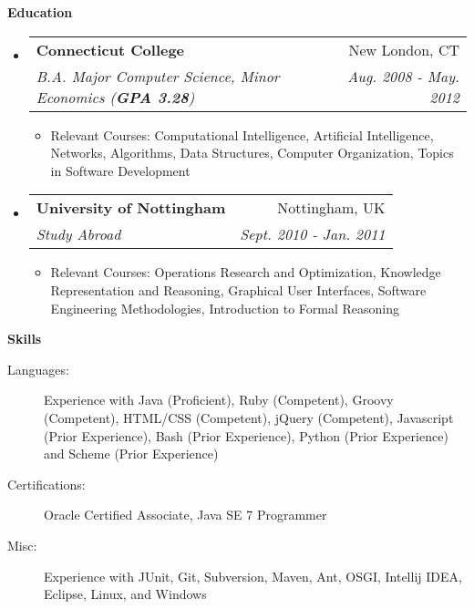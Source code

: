 \documentclass[letterpaper,11pt]{article}
\makeatletter
\newcommand{\resitem}[1]{\item #1 \vspace{-2pt}}
\newcommand{\resheading}[1]{{\large \colorbox{mygrey}{\begin{minipage}{\textwidth}{\textbf{#1 \vphantom{p\^{E}}}}\end{minipage}}}}
\newcommand{\ressubheading}[4]{
\begin{tabular*}{7.0in}{l@{\extracolsep{\fill}}r}
		\textbf{#1} & #2 \\
		\textit{#3} & \textit{#4} \\
\end{tabular*}\vspace{-6pt}}
\makeatother
\begin{document}
\resheading{Education}
\begin{itemize}
	\item
	\ressubheading{Connecticut College}{New London, CT}{B.A. Major Computer Science, Minor Economics (\textbf{GPA 3.28})}{Aug. 2008 - May. 2012}
	\begin{itemize}
		\resitem{Relevant Courses: Computational Intelligence, Artificial Intelligence, Networks, Algorithms, Data Structures, Computer Organization, Topics in Software Development}
	\end{itemize}
	
	\item
	\ressubheading{University of Nottingham}{Nottingham, UK}{Study Abroad}{Sept. 2010 - Jan. 2011}
	\begin{itemize}
		\resitem{Relevant Courses: Operations Research and Optimization, Knowledge Representation and Reasoning, Graphical User Interfaces, Software Engineering Methodologies, Introduction to Formal Reasoning}
	\end{itemize}
\end{itemize}

\resheading{Skills}
\begin{description}
	\item[Languages:]
		Experience with Java (Proficient), Ruby (Competent), Groovy (Competent), HTML/CSS (Competent), jQuery (Competent), Javascript (Prior Experience), Bash (Prior Experience), Python (Prior Experience) and Scheme (Prior Experience)
	\item[Certifications:]
		Oracle Certified Associate, Java SE 7 Programmer
	\item[Misc:]
		Experience with JUnit, Git, Subversion, Maven, Ant, OSGI, Intellij IDEA, Eclipse, Linux, and Windows
\end{description}
\end{document}
